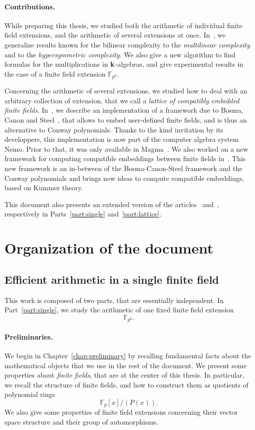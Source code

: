 \paragraph{Contributions.}

While preparing this thesis, we studied both the arithmetic of individual finite
field extensions, and the arithmetic of several extensions at once.
In~\cite{RR21}, we generalize results known for the bilinear complexity to the
\emph{multilinear complexity} and to the \emph{hypersymmetric complexity}. We
also give a new algorithm to find formulas for the multiplications in
$\mathbf{k}$-algebras, and give experimental results in the case of a finite field
extension $\mathbb{F}_{p^{k}}$.

Concerning the arithmetic of several extensions, we studied how to deal with an
arbitrary collection of extension, that we call a \emph{lattice of compatibly
embedded finite fields}. In~\cite{DRR18}, we describe an implementation of a
framework due to Bosma, Canon and Steel~\cite{BCS97}, that allows to embed
user-defined finite fields, and is thus an alternative to Conway polynomials.
Thanks to the kind invitation by its developpers, this implementation is
now part of the computer algebra system Nemo. Prior to that, it was only
available in Magma~\cite{Magma}. We also worked on a new framework for computing
compatible embeddings between finite fields in~\cite{DRR19}. This new framework
is an in-between of the Bosma-Canon-Steel framework and the Conway polynomials
and brings new ideas to compute compatible embeddings, based on Kummer theory.

This document also presents an extended version of the articles~\cite{RR21}
and~\cite{DRR18}, respectively in Parts~\ref{part:single}
and~\ref{part:lattice}.

\section{Organization of the document}
\subsection{Efficient arithmetic in a single finite field}

This work is composed of two parts, that are essentially independent. In
Part~\ref{part:single}, we study the arithmetic of one fixed finite field
extension
\[
  \mathbb{F}_{p^k}.
\]
\paragraph{Preliminaries.} We begin in Chapter~\ref{chap:preliminary} by
recalling fundamental
facts about the mathematical objects that we use in the rest of the document. We
present some properties about \emph{finite fields}, that are at the center of
this thesis. In particular, we recall the structure of finite fields, and how to
construct them as quotients of polynomial rings
\[
  \mathbb{F}_p[x]/(P(x)).
\]
We also give some properties of finite field extensions concerning their vector
space structure and their group of automorphisms.


